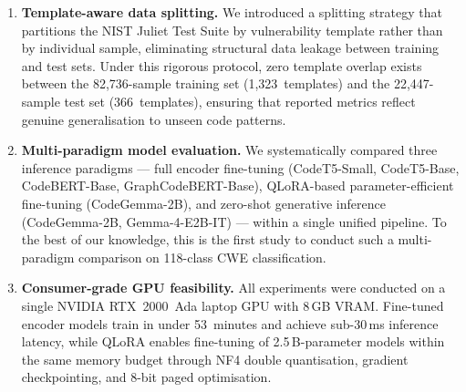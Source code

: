 \documentclass[conference]{IEEEtran}
\begin{document}
\begin{enumerate}
    \item \textbf{Template-aware data splitting.}
          We introduced a splitting strategy that partitions the NIST
          Juliet Test Suite by vulnerability template rather than by
          individual sample, eliminating structural data leakage between
          training and test sets.  Under this rigorous protocol, zero
          template overlap exists between the 82,736-sample training set
          (1,323~templates) and the 22,447-sample test set
          (366~templates), ensuring that reported metrics reflect genuine
          generalisation to unseen code patterns.

    \item \textbf{Multi-paradigm model evaluation.}
          We systematically compared three inference paradigms --- full
          encoder fine-tuning (CodeT5-Small, CodeT5-Base, CodeBERT-Base,
          GraphCodeBERT-Base), QLoRA-based parameter-efficient fine-tuning
          (CodeGemma-2B), and zero-shot generative inference
          (CodeGemma-2B, Gemma-4-E2B-IT) --- within a single unified
          pipeline.  To the best of our knowledge, this is the first study
          to conduct such a multi-paradigm comparison on 118-class CWE
          classification.

    \item \textbf{Consumer-grade GPU feasibility.}
          All experiments were conducted on a single NVIDIA RTX~2000~Ada
          laptop GPU with 8\,GB VRAM.  Fine-tuned encoder models train in
          under 53~minutes and achieve sub-30\,ms inference latency, while
          QLoRA enables fine-tuning of 2.5\,B-parameter models within the
          same memory budget through NF4 double quantisation, gradient
          checkpointing, and 8-bit paged optimisation.


\end{enumerate}
\end{document}
